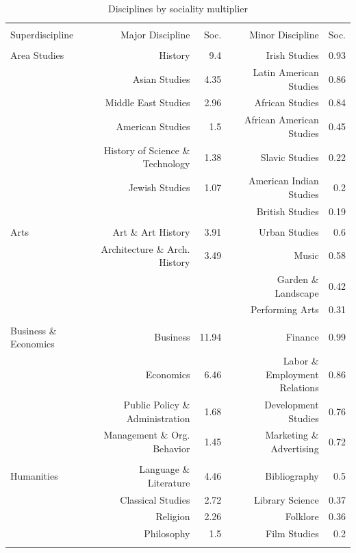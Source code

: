 \documentclass[]{book}
\theoremstyle{definition}
\theoremstyle{definition}
\theoremstyle{definition}
\theoremstyle{remark}
\begin{document}
\begin{table}[!htbp] \centering 
  \caption{Disciplines by sociality multiplier} 
  \label{tab:jclum} 
\small 
\begin{tabular}{@{\extracolsep{5pt}} lrrrr} 
\\[-1.8ex]\hline 
\hline \\[-1.8ex] 
Superdiscipline & Major Discipline & Soc. & Minor Discipline & Soc.  \\ 
\hline \\[-1.8ex] 
Area Studies & History & 9.4 & Irish Studies & 0.93 \\ 
 & Asian Studies & 4.35 & Latin American Studies & 0.86 \\ 
 & Middle East Studies & 2.96 & African Studies & 0.84 \\ 
 & American Studies & 1.5 & African American Studies & 0.45 \\ 
 & History of Science \& Technology & 1.38 & Slavic Studies & 0.22 \\ 
 & Jewish Studies & 1.07 & American Indian Studies & 0.2 \\ 
 &  &  & British Studies & 0.19 \\ 
 &  &  &  &  \\ 
Arts & Art \& Art History & 3.91 & Urban Studies & 0.6 \\ 
 & Architecture \& Arch. History & 3.49 & Music & 0.58 \\ 
 &  &  & Garden \& Landscape & 0.42 \\ 
 &  &  & Performing Arts & 0.31 \\ 
 &  &  &  &  \\ 
Business \& Economics & Business & 11.94 & Finance & 0.99 \\ 
 & Economics & 6.46 & Labor \& Employment Relations & 0.86 \\ 
 & Public Policy \& Administration & 1.68 & Development Studies & 0.76 \\ 
 & Management \& Org. Behavior & 1.45 & Marketing \& Advertising & 0.72 \\ 
 &  &  &  &  \\ 
Humanities & Language \& Literature & 4.46 & Bibliography & 0.5 \\ 
 & Classical Studies & 2.72 & Library Science & 0.37 \\ 
 & Religion & 2.26 & Folklore & 0.36 \\ 
 & Philosophy & 1.5 & Film Studies & 0.2 \\ 
 &  &  &  &  \\ 

\end{tabular}
\end{table}
\end{document}
